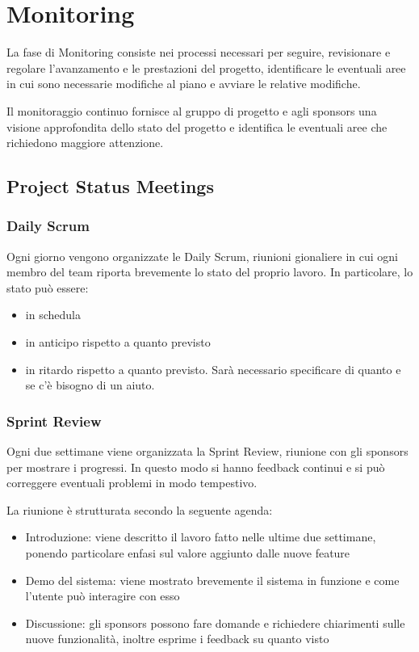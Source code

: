 \chapter{Monitoring}

La fase di Monitoring consiste nei processi necessari per seguire, revisionare e regolare l'avanzamento
e le prestazioni del progetto, identificare le eventuali aree in cui sono necessarie modifiche al piano e avviare le 
relative modifiche.

Il monitoraggio continuo fornisce al gruppo di progetto e agli sponsors una visione approfondita dello stato del progetto
e identifica le eventuali aree che richiedono maggiore attenzione.

\section{Project Status Meetings}

\subsection*{Daily Scrum}

Ogni giorno vengono organizzate le Daily Scrum, riunioni gionaliere in cui ogni membro del team riporta brevemente 
lo stato del proprio lavoro. 
In particolare, lo stato può essere:
\begin{itemize}
    \item in schedula
    \item in anticipo rispetto a quanto previsto
    \item in ritardo rispetto a quanto previsto. Sarà necessario specificare di quanto e se c'è bisogno di un aiuto.
\end{itemize}

\subsection*{Sprint Review}

Ogni due settimane viene organizzata la Sprint Review, riunione con gli sponsors per mostrare i progressi. 
In questo modo si hanno feedback continui e si può correggere eventuali problemi in modo tempestivo. 

La riunione è strutturata secondo la seguente agenda:
\begin{itemize}
    \item Introduzione: viene descritto il lavoro fatto nelle ultime due settimane, ponendo particolare enfasi sul valore aggiunto dalle nuove feature
    \item Demo del sistema: viene mostrato brevemente il sistema in funzione e come l'utente può interagire con esso
    \item Discussione: gli sponsors possono fare domande e richiedere chiarimenti sulle nuove funzionalità, inoltre esprime i feedback su quanto visto
\end{itemize}

